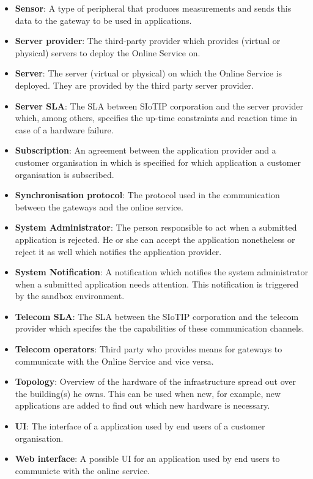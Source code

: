 \documentclass[english]{sareport}
\begin{document}
\begin{itemize}
	\item \textbf{Sensor}: A type of peripheral that produces measurements and sends this data to the gateway to be used in applications.
	\item \textbf{Server provider}: The third-party provider which provides (virtual or physical) servers to deploy the Online Service on.
	\item \textbf{Server}: The server (virtual or physical) on which the Online Service is deployed. They are provided by the third party server provider.
	\item \textbf{Server SLA}: The SLA between SIoTIP corporation and the server provider which, among others, specifies the up-time constraints and reaction time in case of a hardware failure.
	\item \textbf{Subscription}: An agreement between the application provider and a customer organisation in which is specified for which application a customer organisation is subscribed.
	\item \textbf{Synchronisation protocol}: The protocol used in the communication between the gateways and the online service.
	\item \textbf{System Administrator}: The person responsible to act when a submitted application is rejected. He or she can accept the application nonetheless or reject it as well which notifies the application provider.
	\item \textbf{System Notification}: A notification which notifies the system administrator when a submitted application needs attention. This notification is triggered by the sandbox environment.
	\item \textbf{Telecom SLA}: The SLA between the SIoTIP corporation and the telecom provider which specifes the the capabilities of these communication channels.
	\item \textbf{Telecom operators}: Third party who provides means for gateways to communicate with the Online Service and vice versa.
	\item \textbf{Topology}: Overview of the hardware of the infrastructure spread out over the building(s) he owns. This can be used when new, for example, new applications are added to find out which new hardware is necessary.
	\item \textbf{UI}: The interface of a application used by end users of a customer organisation.
	\item \textbf{Web interface}: A possible UI for an application used by end users to communicte with the online service.
\end{itemize}
\end{document}
